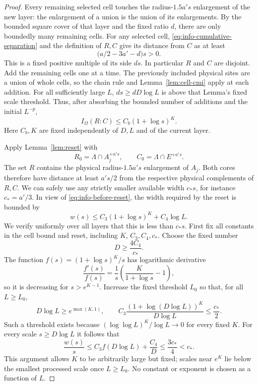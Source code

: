 \documentclass[11pt]{article}
\numberwithin{equation}{section}
\theoremstyle{definition}
\theoremstyle{remark}
\begin{document}
\begin{proof}
Every remaining selected cell touches the radius-$1.5a's$ enlargement
of the new layer: the enlargement of a union is the union of its
enlargements.  By the bounded square cover of that layer and the fixed
ratio $d$, there are only boundedly many remaining cells.  For any
selected cell, \eqref{eq:info-cumulative-separation} and the definition
of $R,C$ give its distance from $C$ as at least
\begin{equation}
 \bigl(a/2-3a'-d\bigr)s>0.
 \label{eq:info-cell-clearance}
\end{equation}
This is a fixed positive multiple of its side $ds$.  In particular
$R$ and $C$ are disjoint.  Add the remaining cells one at a time.
The previously included physical sites are a union of whole cells,
so the chain rule and Lemma~\ref{lem:cell-cmi} apply at each addition.
For all sufficiently large $L$, $ds\ge dD\log L$ is above that
Lemma's fixed scale threshold.  Thus, after absorbing the bounded
number of additions and the initial $L^{-p}$,
\begin{equation}
 I_\Omega(R:C)\le C_b(1+\log s)^K.
 \label{eq:info-before-reset}
\end{equation}
Here $C_b,K$ are fixed independently of $D,L$ and of the current layer.

Apply Lemma~\ref{lem:reset} with
\[
 R_0=\Lambda\cap A_j^{+a's},\qquad C_0=\Lambda\cap E^{+a's}.
\]
The set $R$ contains the physical radius-$1.5a's$ enlargement of
$A_j$.  Both cores therefore have distance at least $a's/2$ from
the respective physical complements of $R,C$.  We can safely use
any strictly smaller available width $c_*s$, for instance $c_*=a'/3$.
In view of \eqref{eq:info-before-reset}, the width required by the
reset is bounded by
\begin{equation}
 w(s)\le C_3(1+\log s)^K+C_4\log L.
 \label{eq:info-reset-scale-cost}
\end{equation}
We verify uniformly over all layers that this is less than $c_*s$.
First fix all constants in the cell bound and reset, including $K$,
$C_3,C_4,c_*$.  Choose the fixed number
\[
 D\ge\frac{4C_4}{c_*}.
\]
The function $f(s)=(1+\log s)^K/s$ has logarithmic derivative
\[
 \frac{f'(s)}{f(s)}
     =\frac1s\left(\frac K{1+\log s}-1\right),
\]
so it is decreasing for $s>e^{K-1}$.  Increase the fixed threshold
$L_0$ so that, for all $L\ge L_0$,
\[
 D\log L\ge e^{\max(K,1)},\qquad
 C_3\frac{(1+\log(D\log L))^K}{D\log L}\le\frac{c_*}{2}.
\]
Such a threshold exists because
$(\log\log L)^K/\log L\to0$ for every fixed $K$.
For every scale $s\ge D\log L$ it follows that
\[
 \frac{w(s)}s
 \le C_3 f(D\log L)+\frac{C_4}{D}
 \le\frac{3c_*}{4}<c_*.
\]
This argument allows $K$ to be arbitrarily large but fixed; scales near
$e^K$ lie below the smallest processed scale once $L\ge L_0$.  No
constant or exponent is chosen as a function of $L$.


\end{proof}
\end{document}
